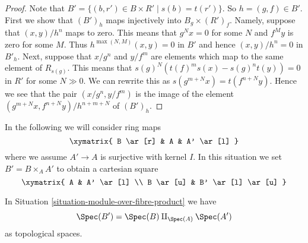 \begin{proof}
Note that $B' = \{(b, r') \in B \times R' \mid s(b) = t(r')\}$.
So $h = (g, f) \in B'$. First we show that $(B')_h$ maps
injectively into $B_g \times (R')_f$. Namely, suppose that
$(x, y)/h^n$ maps to zero. This means that
$g^Nx = 0$ for some $N$ and $f^My$ is zero for some $M$.
Thus $h^{\max(N, M)}(x, y) = 0$ in $B'$ and hence $(x, y)/h^n = 0$
in $B'_h$.
Next, suppose that $x/g^n$ and $y/f^m$ are elements
which map to the same element of $R_{s(g)}$.
This means that $s(g)^N(t(f)^ms(x) - s(g)^nt(y)) = 0$ in $R'$
for some $N \gg 0$. We can rewrite this as
$s(g^{m + N}x) = t(f^{n + N}y)$. Hence we see that the
pair $(x/g^n, y/f^m)$ is the image of the element
$(g^{m + N}x, f^{n + N}y)/h^{n + m + N}$ of
$(B')_h$.
\end{proof}

\begin{situation}
\label{situation-module-over-fibre-product}
In the following we will consider ring maps
$$
\xymatrix{
B \ar[r] & A & A' \ar[l]
}
$$
where we assume $A' \to A$ is surjective with kernel $I$.
In this situation we set $B' = B \times_A A'$ to
obtain a cartesian square
$$
\xymatrix{
A & A' \ar[l] \\
B \ar[u] & B' \ar[l] \ar[u]
}
$$
\end{situation}

\begin{lemma}
\label{lemma-points-of-fibre-product}
In Situation \ref{situation-module-over-fibre-product}
we have
$$
\Spec(B') = \Spec(B) \amalg_{\Spec(A)} \Spec(A')
$$
as topological spaces.
\end{lemma}

